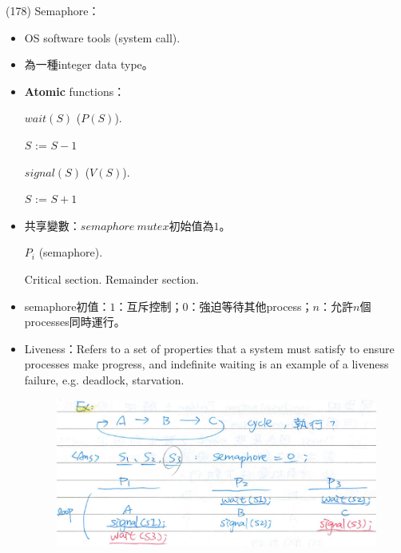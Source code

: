 \begin{theorem}{(178)} Semaphore：\begin{itemize}
        \item OS software tools (system call).
        \item 為一種integer data type。
        \item \textbf{Atomic} functions：
        \begin{algorithm}[H]
            \caption{$wait(S)$ ($P(S)$).}
            \begin{algorithmic}[1]
                    \EndWhile
                    \State $S$ := $S - 1$
                \EndFunction
            \end{algorithmic}
        \end{algorithm}
        \begin{algorithm}[H]
            \caption{$signal(S)$ ($V(S)$).}
            \begin{algorithmic}[1]
                    \State $S$ := $S + 1$
                \EndFunction
            \end{algorithmic}
        \end{algorithm}
        \item 共享變數：$semaphore \ mutex$初始值為$1$。
        \begin{algorithm}[H]
            \caption{$P_i$ (semaphore).}
            \begin{algorithmic}[1]
                    \Repeat
                        \State {}
                        \State Critical section.
                        \State {}
                        \State Remainder section.
                \EndFunction
            \end{algorithmic}
        \end{algorithm}
        \item semaphore初值：$1$：互斥控制；$0$：強迫等待其他process；$n$：允許$n$個processes同時運行。
        \item Liveness：Refers to a set of properties that a system must satisfy to ensure processes make progress, and indefinite waiting is an example of a liveness failure, e.g. deadlock, starvation.
        \begin{figure}[H]
            \centering
            \includegraphics[scale=0.75]{img/ex_semaphore.png}

\end{figure}
\end{itemize}
\end{theorem}
